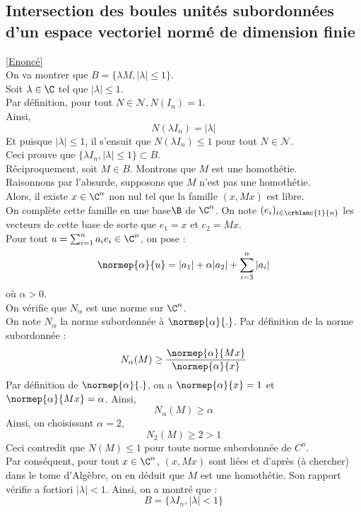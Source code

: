 \documentclass{book}
\begin{document}
	\subsection{Intersection des boules unités subordonnées d'un espace vectoriel normé de dimension finie}\label{sec:intersection-des-boules-unites-subordonnees-dun-espace-vectoriel-norme-de-dimension-finie}
		\textcolor{blue}{\hyperref[Intersection des boules unités subordonnées d'un espace vectoriel normé de dimension finie]{[Enoncé]}}\\
	On va montrer que $B=\{\lambda M, |\lambda|\leq1\}$.\\
	Soit $\lambda\in\C$ tel que $|\lambda|\leq 1$.\\
	Par définition, pour tout $N\in\mathcal{N}, N(I_n)=1$.\\
	Ainsi, \[N(\lambda I_n)=|\lambda|\]
	Et puisque $|\lambda|\leq 1$, il s'ensuit que $N(\lambda I_n)\leq 1$ pour tout $N\in\mathcal{N}$.\\
	Ceci prouve que $\{\lambda I_n, |\lambda|\leq1\}\subset B$.\\
	Réciproquement, soit $M\in B$. Montrons que $M$ est une homothétie.\\
	Raisonnons par l'absurde, supposons que $M$ n'est pas une homothétie.\\
	Alors, il existe $x\in\C^n$ non nul tel que la famille $(x,Mx)$ est libre.\\
	On complète cette famille en une base$\B$ de $\C^n$. On note $(e_i)_{i\in\crblanc{1}{n}}$ les vecteurs de cette base de sorte que $e_1=x$ et $e_2=Mx$.\\
	Pour tout $u=\sum_{i=1}^{n}a_ie_i\in\C^n$, on pose : 
	\[\normep{\alpha}{u}=|a_1|+\alpha|a_2|+\sum_{i=3}^{n}|a_i|\]
	où $\alpha>0$.\\
	On vérifie que $N_\alpha$ est une norme sur $\C^n$.\\
	On note $N_\alpha$ la norme subordonnée à $\normep{\alpha}{.}$. Par définition de la norme subordonnée : 
	\[N_\alpha(M)\geq \frac{\normep{\alpha}{Mx}}{\normep{\alpha}{x}}\]
	Par définition de $\normep{\alpha}{.}$, on a $\normep{\alpha}{x}=1$ et $\normep{\alpha}{Mx}=\alpha$.
	Ainsi, \[N_\alpha(M)\geq\alpha\]
	Ainsi, on choisissant $\alpha=2$, \[N_2(M)\geq2>1\]
	Ceci contredit que $N(M)\leq 1$ pour toute norme subordonnée de $C^n$.\\
	Par conséquent, pour tout $x\in\C^n$, $(x,Mx)$ sont liées et d'après (à chercher) dans le tome d'Algèbre, on en déduit que $M$ est une homothétie. Son rapport vérifie a fortiori $|\lambda|<1$.
	Ainsi, on a montré que :
	\[B=\{\lambda I_n, |\lambda|<1\}\]
\end{document}
